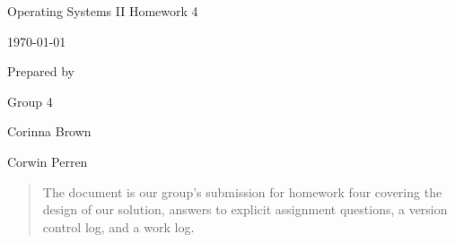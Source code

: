 \documentclass[onecolumn, draftclsnofoot, 10pt, compsoc]{IEEEtran}
\newcommand{\NameSigPair}[1]{
  \par
  \makebox[2.75in][r]{#1} 
  \hfill
  \makebox[3.25in]{
      \makebox[2.25in]{\hrulefill} 
      \hfill
      \makebox[.75in]{\hrulefill}
  }
  \par\vspace{-12pt} 
  \textit{
      \tiny\noindent
      \makebox[2.75in]{} 
      \hfill
      \makebox[3.25in]{
          \makebox[2.25in][r]{Signature} 
          \hfill
          \makebox[.75in][r]{Date}
      }
  }
}
\renewcommand{\NameSigPair}[1]{#1}
\begin{document}
\begin{titlepage}
	\begin{singlespace}
		\par\vspace{2in}
		\centering
		\scshape{
			\huge Operating Systems II Homework 4 \par
			{\large\today}\par
			\vspace{.5in}
			\vfill
			\vspace{5pt}
			{\large Prepared by }\par
			Group 4 \par
			\vspace{5pt}
			{\Large
				\NameSigPair{Corinna Brown}\par
				\NameSigPair{Corwin Perren}\par
			}
			\vspace{20pt}
            \begin{abstract}
            The document is our group's submission for homework four covering the design of our solution, answers to explicit assignment questions, a version control log, and a work log.
			\end{abstract}
		}
	\end{singlespace}
\end{titlepage}
\newpage
{}
\tableofcontents
\clearpage





\end{document}

